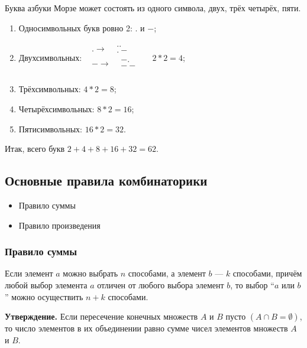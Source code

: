 \documentclass{article}
\begin{document}
    Буква азбуки Морзе может состоять из одного символа, двух, трёх четырёх, пяти.
    \begin{enumerate}
        \item Односимвольных букв ровно 2: . и \(-\);
        \item Двухсимвольных:\quad\(\begin{aligned}
            &. \rightarrow \begin{aligned}
                &..\\
                &.-
            \end{aligned}\\
            &- \rightarrow \begin{aligned}
                &-.\\
                &--
            \end{aligned}\\
        \end{aligned}\quad 2 * 2 = 4\);
        \item Трёхсимвольных: \(4 * 2 = 8\);
        \item Четырёхсимвольных: \(8 * 2 = 16\);
        \item Пятисимвольных: \(16 * 2 = 32\).
    \end{enumerate}
    Итак, всего букв \(2+4+8+16+32=62\).

    \subsection{Основные правила комбинаторики}

    \begin{itemize}
        \item Правило суммы
        \item Правило произведения
    \end{itemize}

    \subsubsection{Правило суммы}
        
        Если элемент \(a\) можно выбрать \(n\) способами, а элемент \(b\) --- \(k\) способами, причём любой выбор элемента \(a\) отличен от любого выбора элемент \(b\), то выбор ``\(a\) или \(b\)'' можно осуществить \(n+k\) способами.
        
        \textbf{Утверждение.} Если пересечение конечных множеств \(A\) и \(B\) пусто \((A \cap B = \emptyset)\), то число элементов в их объединении равно сумме чисел элементов множеств \(A\) и \(B\).
\end{document}
